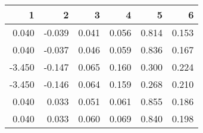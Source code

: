 \begin{table}[ht]
\centering
\begin{tabular}{rrrrrr}
  \hline
1 & 2 & 3 & 4 & 5 & 6 \\ 
  \hline
0.040 & -0.039 & 0.041 & 0.056 & 0.814 & 0.153 \\ 
  0.040 & -0.037 & 0.046 & 0.059 & 0.836 & 0.167 \\ 
  -3.450 & -0.147 & 0.065 & 0.160 & 0.300 & 0.224 \\ 
  -3.450 & -0.146 & 0.064 & 0.159 & 0.268 & 0.210 \\ 
  0.040 & 0.033 & 0.051 & 0.061 & 0.855 & 0.186 \\ 
  0.040 & 0.033 & 0.060 & 0.069 & 0.840 & 0.198 \\ 
   \hline
\end{tabular}
\end{table}
